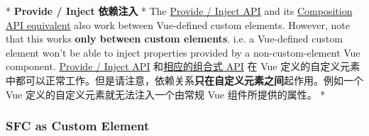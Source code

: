 \begin{paracol}{2}
\begin{itemize}
\begin{codeHtml}
\end{codeHtml}
\end{itemize}
\switchcolumn[0]*%
\textbf{Provide / Inject}
\switchcolumn
\textbf{依赖注入}
\switchcolumn[0]*%
The
\href{https://vuejs.org/guide/components/provide-inject.html\#provide-inject}{Provide
/ Inject API} and its
\href{https://vuejs.org/api/composition-api-dependency-injection.html\#provide}{Composition
API equivalent} also work between Vue-defined custom elements. However,
note that this works \textbf{only between custom elements}. i.e. a
Vue-defined custom element won't be able to inject properties provided
by a non-custom-element Vue component.
\switchcolumn
\href{https://cn.vuejs.org/guide/components/provide-inject.html\#provide-inject}{Provide
/ Inject API}
和\href{https://cn.vuejs.org/api/composition-api-dependency-injection.html\#provide}{相应的组合式
API} 在 Vue
定义的自定义元素中都可以正常工作。但是请注意，依赖关系\textbf{只在自定义元素之间}起作用。例如一个
Vue 定义的自定义元素就无法注入一个由常规 Vue 组件所提供的属性。
\switchcolumn[0]*%
\subsubsection{SFC as Custom Element}
\switchcolumn

\end{paracol}
